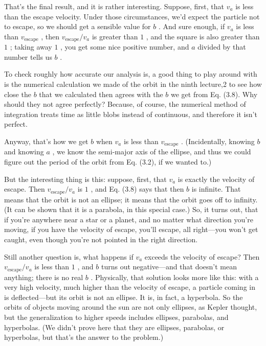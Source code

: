 \documentclass[11pt,oneside]{article}
\begin{document}
That's the final result, and it is rather interesting. Suppose, first, that \(v_a\) is less than the escape velocity. Under those circumstances, we'd expect the particle not to escape, so we should get a sensible value for \(b\) . And sure enough, if \(v_a\) is less than \(v_\text{escape}\) , then \(v_\text{escape}/v_a\) is greater than \(1\) , and the square is also greater than \(1\) ; taking away \(1\) , you get some nice positive number, and \(a\) divided by that number tells us \(b\) .\par

To check roughly how accurate our analysis is, a good thing to play around with is the numerical calculation we made of the orbit in the ninth lecture,2 to see how close the \(b\) that we calculated then agrees with the \(b\) we get from Eq. (3.8). Why should they not agree perfectly? Because, of course, the numerical method of integration treats time as little blobs instead of continuous, and therefore it isn't perfect.\par

Anyway, that's how we get \(b\) when \(v_a\) is less than \(v_\text{escape}\) . (Incidentally, knowing \(b\) and knowing \(a\) , we know the semi-major axis of the ellipse, and thus we could figure out the period of the orbit from Eq. (3.2), if we wanted to.)\par

But the interesting thing is this: suppose, first, that \(v_a\) is exactly the velocity of escape. Then \(v_\text{escape}/v_a\) is \(1\) , and Eq. (3.8) says that then \(b\) is infinite. That means that the orbit is not an ellipse; it means that the orbit goes off to infinity. (It can be shown that it is a parabola, in this special case.) So, it turns out, that if you're anywhere near a star or a planet, and no matter what direction you're moving, if you have the velocity of escape, you'll escape, all right---you won't get caught, even though you're not pointed in the right direction.\par

Still another question is, what happens if \(v_a\) exceeds the velocity of escape? Then \(v_\text{escape}/v_a\) is less than \(1\) , and \(b\) turns out negative---and that doesn't mean anything; there is no real \(b\) . Physically, that solution looks more like this: with a very high velocity, much higher than the velocity of escape, a particle coming in is deflected---but its orbit is not an ellipse. It is, in fact, a hyperbola. So the orbits of objects moving around the sun are not only ellipses, as Kepler thought, but the generalization to higher speeds includes ellipses, parabolas, and hyperbolas. (We didn't prove here that they are ellipses, parabolas, or hyperbolas, but that's the answer to the problem.)\par
\end{document}
